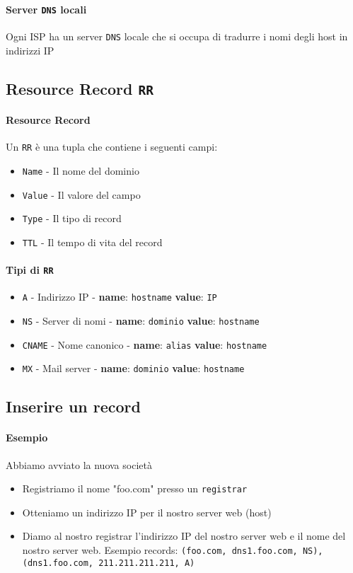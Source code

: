         \paragraph{Server \texttt{DNS} locali} Ogni ISP ha un server \texttt{DNS} locale che si occupa di tradurre i nomi degli host in indirizzi IP
    \subsection{Resource Record \texttt{RR}}
        \paragraph{Resource Record} Un \texttt{RR} è una tupla che contiene i seguenti campi:
        \begin{itemize}
            \item \texttt{Name} - Il nome del dominio
            \item \texttt{Value} - Il valore del campo
            \item \texttt{Type} - Il tipo di record
            \item \texttt{TTL} - Il tempo di vita del record
        \end{itemize}
        \paragraph{Tipi di \texttt{RR}}
        \begin{itemize}
            \item \texttt{A} - Indirizzo IP - \textbf{name}: \texttt{hostname} \textbf{value}: \texttt{IP}
            \item \texttt{NS} - Server di nomi - \textbf{name}: \texttt{dominio} \textbf{value}: \texttt{hostname}
            \item \texttt{CNAME} - Nome canonico - \textbf{name}: \texttt{alias} \textbf{value}: \texttt{hostname}
            \item \texttt{MX} - Mail server - \textbf{name}: \texttt{dominio} \textbf{value}: \texttt{hostname}
        \end{itemize}
    \subsection{Inserire un record}
        \paragraph{Esempio} Abbiamo avviato la nuova società
        \begin{itemize}
            \item Registriamo il nome "foo.com" presso un \texttt{registrar}
            \item Otteniamo un indirizzo IP per il nostro server web (host)
            \item Diamo al nostro registrar l'indirizzo IP del nostro server web e il nome del nostro server web. Esempio records: \texttt{(foo.com, dns1.foo.com, NS), (dns1.foo.com, 211.211.211.211, A)}
        \end{itemize}
